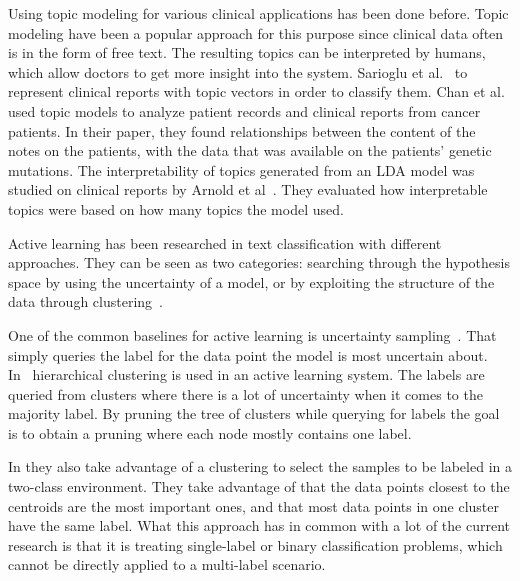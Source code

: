 Using topic modeling for various clinical applications has been done before.
Topic modeling have been a popular approach for this purpose since clinical data often is in the form of free text.
The resulting topics can be interpreted by humans, which allow doctors to get more insight into the system.
Sarioglu et al\@.~\cite{sarioglu2013topic} to represent clinical reports with topic vectors in order to classify them.
Chan et al\@.~\cite{chan2013empirical} used topic models to analyze patient records and clinical reports from cancer patients.
In their paper, they found relationships between the content of the notes on the patients, with the data that was available on the patients' genetic mutations.
The interpretability of topics generated from an LDA model was studied on clinical reports by Arnold et al~\cite{arnold2016evaluating}.
They evaluated how interpretable topics were based on how many topics the model used.

Active learning has been researched in text classification with different approaches.
They can be seen as two categories: searching through the hypothesis space by using the uncertainty of a model, or by exploiting the structure of the data through clustering~\cite{dasgupta2008hierarchical}.

One of the common baselines for active learning is uncertainty sampling~\cite{lewis1994sequential}.
That simply queries the label for the data point the model is most uncertain about.
In~\cite{dasgupta2008hierarchical} hierarchical clustering is used in an active learning system.
The labels are queried from clusters where there is a lot of uncertainty when it comes to the majority label.
By pruning the tree of clusters while querying for labels the goal is to obtain a pruning where each node mostly contains one label.

In \cite{nguyen2004active} they also take advantage of a clustering to select the samples to be labeled in a two-class environment.
They take advantage of that the data points closest to the centroids are the most important ones, and that most data points in one cluster have the same label.
What this approach has in common with a lot of the current research is that it is treating single-label or binary classification problems, which cannot be directly applied to a multi-label scenario.


